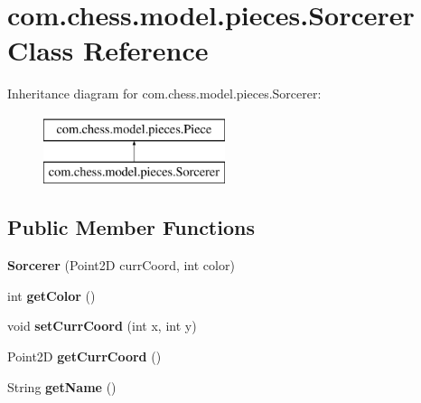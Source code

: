 \hypertarget{classcom_1_1chess_1_1model_1_1pieces_1_1_sorcerer}{}\section{com.\+chess.\+model.\+pieces.\+Sorcerer Class Reference}
\label{classcom_1_1chess_1_1model_1_1pieces_1_1_sorcerer}
Inheritance diagram for com.\+chess.\+model.\+pieces.\+Sorcerer\+:\begin{figure}[H]
\begin{center}
\leavevmode
\includegraphics[height=2.000000cm]{classcom_1_1chess_1_1model_1_1pieces_1_1_sorcerer}
\end{center}
\end{figure}
\subsection*{Public Member Functions}
\begin{DoxyCompactItemize}
\item 
\mbox{\label{classcom_1_1chess_1_1model_1_1pieces_1_1_sorcerer_aca512b109175e1ee7191a9b704ae48e2}} 
{\bfseries Sorcerer} (Point2D curr\+Coord, int color)
\item 
\mbox{\label{classcom_1_1chess_1_1model_1_1pieces_1_1_sorcerer_a7e0167619b1f4b1aa1d19d11889be47b}} 
int {\bfseries get\+Color} ()
\item 
\mbox{\label{classcom_1_1chess_1_1model_1_1pieces_1_1_sorcerer_a65886987a5ea02bd8b03713435614155}} 
void {\bfseries set\+Curr\+Coord} (int x, int y)
\item 
\mbox{\label{classcom_1_1chess_1_1model_1_1pieces_1_1_sorcerer_a15708aa3abd97bf3b331cc94979cd7c1}} 
Point2D {\bfseries get\+Curr\+Coord} ()
\item 
\mbox{\label{classcom_1_1chess_1_1model_1_1pieces_1_1_sorcerer_aafe63b383157877f39a37a81a2ee2781}} 
String {\bfseries get\+Name} ()
\end{DoxyCompactItemize}


